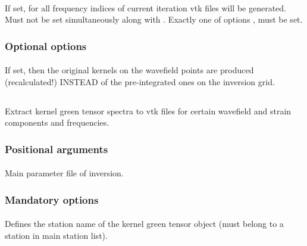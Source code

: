 \paragraph{}
If set, for all frequency indices of current iteration vtk files will be generated. Must not be set simultaneously along with .
Exactly one of options  ,  must be set.
\subsubsection{Optional options}
\paragraph{}
If set, then the original kernels on the wavefield points are produced (recalculated!) INSTEAD of the pre-integrated ones on the inversion grid.
%
%
\subsection{} \label{programs_scripts,sec:bin_prog,sec:kgt_2_vtk}
Extract kernel green tensor spectra to vtk files for certain wavefield and strain components and frequencies.
\subsubsection{Positional arguments}
\paragraph{}
Main parameter file of inversion.
\subsubsection{Mandatory options}
\paragraph{ }
Defines the station name of the kernel green tensor object (must belong to a station in main station list).
